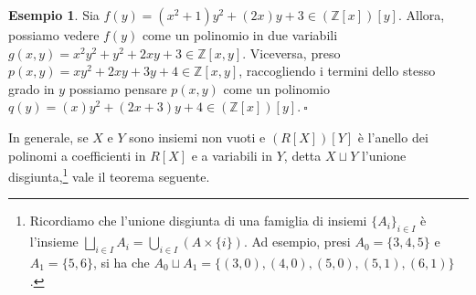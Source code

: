 \documentclass{article}
\theoremstyle{definition}
\newtheorem*{exm}{Esempio}
\begin{document}
\begin{exm}Sia $f(y)=(x^2+1)y^2+(2x)y+3 \in (\mathbb{Z}[x])[y]$. Allora, possiamo vedere $f(y)$ come un polinomio in due variabili $g(x,y)=x^2y^2+y^2+2xy+3 \in \mathbb{Z}[x,y]$. Viceversa, preso $p(x,y)=xy^2+2xy+3y+4\in \mathbb{Z}[x,y]$, raccogliendo i termini dello stesso grado in $y$ possiamo pensare $p(x,y)$ come un polinomio $q(y)=(x)y^2+(2x+3)y+4 \in (\mathbb{Z}[x])[y]. \ \square$\end{exm}

\noindent In generale, se $X$ e $Y$ sono insiemi non vuoti e $(R[X])[Y]$ è l'anello dei polinomi a coefficienti in $R[X]$ e a variabili in $Y$, detta $X \sqcup Y$ l'unione disgiunta,\footnote{Ricordiamo che l'unione disgiunta di una famiglia di insiemi $\{A_i\}_{i\in I}$ è l'insieme $\bigsqcup\limits_{i\in I} A_i = \bigcup\limits_{i\in I} (A \times \{i\})$. Ad esempio, presi $A_0=\{3,4,5\}$ e $A_1=\{5,6\}$, si ha che $A_0 \sqcup A_1=\{(3,0), (4,0), (5,0), (5,1), (6,1)\}$.} vale il teorema seguente.
\end{document}
